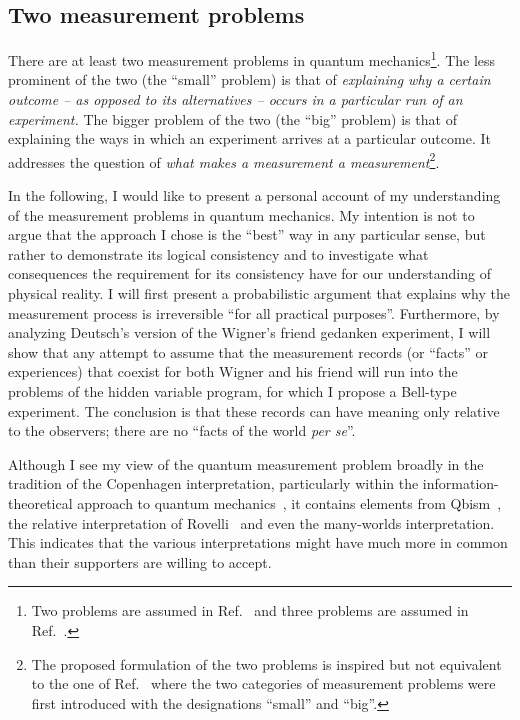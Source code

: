 \documentclass[12pt,a4]{article}
\begin{document}
\setcounter{page}{1}
\subsection*{Two measurement problems}

There are at least two measurement problems in quantum mechanics\footnote{Two problems are assumed in Ref.~\cite{bub,pitowsky} and three problems are assumed in Ref.~\cite{maudlin}.}. The less prominent of the two (the ``small'' problem) is that of {\em explaining why a certain outcome -- as opposed to its alternatives -- occurs in a particular run of an experiment.} The bigger problem of the two (the ``big'' problem) is that of explaining the ways in which an experiment arrives at a particular outcome. It addresses the question of {\em what makes a measurement a measurement}\footnote{The proposed formulation of the two problems is inspired but not equivalent to the one of Ref.~\cite{bub,pitowsky} where the two categories of measurement problems were first introduced with the designations ``small'' and ``big''.}. 

In the following, I would like to present a personal account of my understanding of the measurement problems in quantum mechanics. My intention is not to argue that the approach I chose is the ``best'' way in any particular sense, but rather to demonstrate its logical consistency and to investigate what consequences the requirement for its consistency have for our understanding of physical reality. I will first present a probabilistic argument that explains why the measurement process is irreversible ``for all practical purposes''. Furthermore, by analyzing Deutsch's version of the Wigner's friend gedanken experiment, I will show that any attempt to assume that the measurement records (or ``facts'' or experiences) that coexist for both Wigner and his friend will run into the problems of the hidden variable program, for which I propose a Bell-type experiment. The conclusion is that these records can have meaning only relative to the observers; there are no ``facts of the world {\it per se}''.

Although I see my view of the quantum measurement problem broadly in the tradition of the Copenhagen interpretation, particularly within the information-theoretical approach to quantum mechanics~\cite{cbaz}, it contains elements from Qbism~\cite{qbism}, the relative interpretation of Rovelli~\cite{rovelli} and even the many-worlds interpretation. This indicates that the various interpretations might have much more in common than their supporters are willing to accept.
\end{document}

